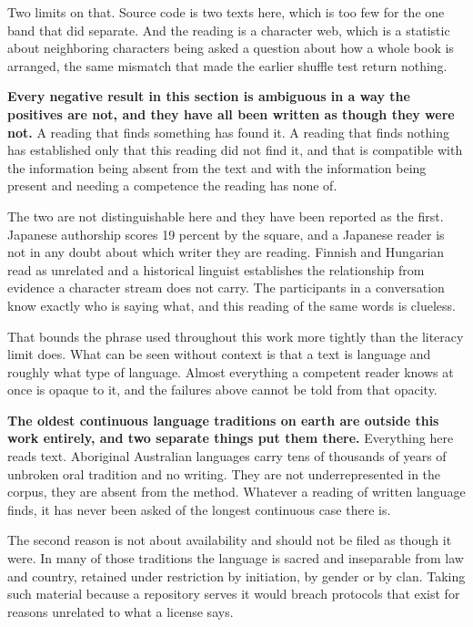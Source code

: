 Two limits on that. Source code is two texts here, which is too few for the one band that did separate. And the reading is a character web, which is a statistic about neighboring characters being asked a question about how a whole book is arranged, the same mismatch that made the earlier shuffle test return nothing.

\textbf{Every negative result in this section is ambiguous in a way the positives are not, and they have all been written as though they were not.} A reading that finds something has found it. A reading that finds nothing has established only that this reading did not find it, and that is compatible with the information being absent from the text and with the information being present and needing a competence the reading has none of.

The two are not distinguishable here and they have been reported as the first. Japanese authorship scores 19 percent by the square, and a Japanese reader is not in any doubt about which writer they are reading. Finnish and Hungarian read as unrelated and a historical linguist establishes the relationship from evidence a character stream does not carry. The participants in a conversation know exactly who is saying what, and this reading of the same words is clueless.

That bounds the phrase used throughout this work more tightly than the literacy limit does. What can be seen without context is that a text is language and roughly what type of language. Almost everything a competent reader knows at once is opaque to it, and the failures above cannot be told from that opacity.

\textbf{The oldest continuous language traditions on earth are outside this work entirely, and two separate things put them there.} Everything here reads text. Aboriginal Australian languages carry tens of thousands of years of unbroken oral tradition and no writing. They are not underrepresented in the corpus, they are absent from the method. Whatever a reading of written language finds, it has never been asked of the longest continuous case there is.

The second reason is not about availability and should not be filed as though it were. In many of those traditions the language is sacred and inseparable from law and country, retained under restriction by initiation, by gender or by clan. Taking such material because a repository serves it would breach protocols that exist for reasons unrelated to what a license says.

